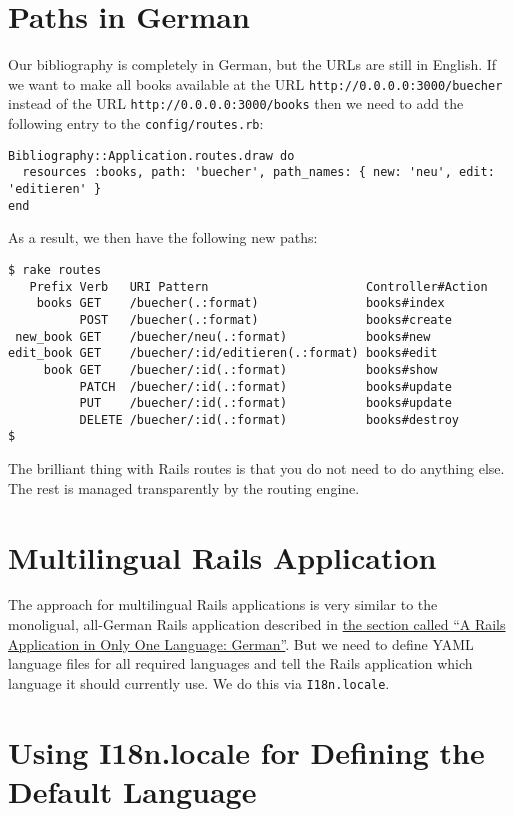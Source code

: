 \documentclass[a4paper]{book}
\newcommand{\chap}[1]{\newpage\thispagestyle{empty}\chapter{#1}\label{chap:\thechapter}}
\begin{document}
\chap{Paths in German}\label{paths-in-german}

Our bibliography is completely in German, but the URLs are still in English. If we want to make all books available at the URL \texttt{http://0.0.0.0:3000/buecher} instead of the URL \texttt{http://0.0.0.0:3000/books} then we need to add the following entry to the \texttt{config/routes.rb}:

\begin{shaded}\begin{verbatim}
Bibliography::Application.routes.draw do
  resources :books, path: 'buecher', path_names: { new: 'neu', edit: 'editieren' }
end
\end{verbatim}\end{shaded}

As a result, we then have the following new paths:

\begin{shaded}\begin{verbatim}
$ rake routes
   Prefix Verb   URI Pattern                      Controller#Action
    books GET    /buecher(.:format)               books#index
          POST   /buecher(.:format)               books#create
 new_book GET    /buecher/neu(.:format)           books#new
edit_book GET    /buecher/:id/editieren(.:format) books#edit
     book GET    /buecher/:id(.:format)           books#show
          PATCH  /buecher/:id(.:format)           books#update
          PUT    /buecher/:id(.:format)           books#update
          DELETE /buecher/:id(.:format)           books#destroy
$
\end{verbatim}\end{shaded}

The brilliant thing with Rails routes is that you do not need to do anything else. The rest is managed transparently by the routing engine.

\chap{Multilingual Rails Application}\label{multilingual-rails-application}

The approach for multilingual Rails applications is very similar to the monoligual, all-German Rails application described in \hyperref[i18nux5feinsprachigux5fdeutsch]{the section called “A Rails Application in Only One Language: German”}. But we need to define YAML language files for all required languages and tell the Rails application which language it should currently use. We do this via \texttt{I18n.locale}.

\chap{Using I18n.locale for Defining the Default Language}\label{using-i18n.locale-for-defining-the-default-language}
\end{document}

